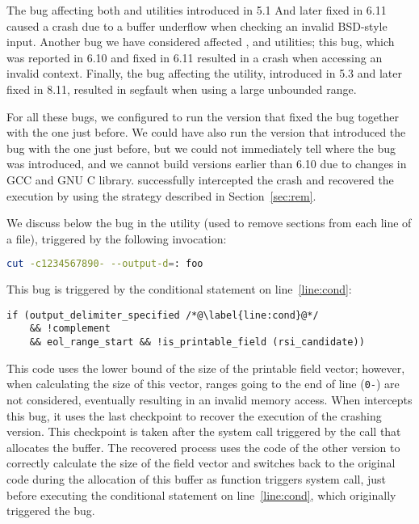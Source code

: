 The bug affecting both \mdsum and \shasum utilities introduced in 5.1
And later fixed in 6.11 caused a crash due to a buffer underflow when
checking an invalid BSD-style input. Another bug we have considered
affected \mkdir, \mkfifo and \mknod utilities; this bug, which was
reported in 6.10 and fixed in 6.11 resulted in a crash when accessing
an invalid context.  Finally, the bug affecting the \cut utility,
introduced in 5.3 and later fixed in 8.11, resulted in segfault when
using a large unbounded range. 

For all these bugs, we configured \mx to run the version that fixed the
bug together with the one just before. We could have also run the
version that introduced the bug with the one just before, but we could
not immediately tell where the bug was introduced, and we cannot build
versions earlier than 6.10 due to changes in GCC and GNU C library. \mx
successfully intercepted the crash and recovered the execution by using
the strategy described in Section~\ref{sec:rem}.

We discuss below the bug in the \cut utility (used to remove sections
from each line of a file), triggered by the following invocation:

\begin{lstlisting}[numbers=none,breaklines=true,xleftmargin=0pt,language=bash]
cut -c1234567890- --output-d=: foo
\end{lstlisting}

This bug is triggered by the conditional statement on line~\ref{line:cond}:

\begin{lstlisting}[firstnumber=525]
if (output_delimiter_specified /*@\label{line:cond}@*/
    && !complement
    && eol_range_start && !is_printable_field (rsi_candidate))
\end{lstlisting}

This code uses the lower bound of the size of the printable field
vector; however, when calculating the size of this vector, ranges going
to the end of line (\ie \lstinline`0-`) are not considered, eventually
resulting in an invalid memory access. 
When \mx intercepts this bug, it uses the
last checkpoint to recover the execution of the crashing version. This
checkpoint is taken after the  system call triggered by
the  call that allocates the buffer. 
The recovered process uses the code of the other version to correctly
calculate the size of the field vector and switches back to the original
code during the allocation of this buffer as
function  triggers  system call, just
before executing the conditional statement on line~\ref{line:cond},
which originally triggered the bug.


